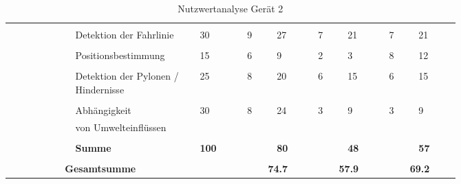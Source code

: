 \documentclass[main.tex]{subfiles} %
\begin{document}
\begin{landscape}
\begin{table}[ht]
\begin{tabular}{|p{0.11\linewidth}|p{0.18\linewidth}|p{0.085\linewidth}|p{0.057\linewidth}|p{0.07\linewidth}|p{0.057\linewidth}|p{0.07\linewidth}|p{0.057\linewidth}|p{0.07\linewidth}|}
            \cline{2-9}
            &&&&&&&&\\[-9pt]
            & Detektion der Fahrlinie & 30 & 9 & 27 & 7 & 21 & 7 & 21 \\[1pt]
            \cline{2-9}
            &&&&&&&&\\[-9pt]
            & Positionsbestimmung & 15 & 6 & 9 & 2 & 3 & 8 & 12 \\[1pt]
            \cline{2-9}
            &&&&&&&&\\[-9pt]
            & Detektion der Pylonen / Hindernisse & 25 & 8 & 20 & 6 & 15 & 6 & 15 \\[1pt]
            \cline{2-9}
            &&&&&&&&\\[-9pt]
            & Abhängigkeit & 30 & 8 & 24 & 3 & 9 & 3 & 9 \\[1pt]
            & von Umwelteinflüssen &  &  &  &  &  &  &  \\[1pt]
            \cline{2-9}
            &&&&&&&&\\[-9pt]
            & \textbf{Summe} & \textbf{100} &  & \textbf{80} &  & \textbf{48} &  & \textbf{57} \\[1pt]
            \hline
            \hline
            \multicolumn{2}{|c|}{} &&\multicolumn{2}{c|}{}&\multicolumn{2}{c|}{}&\multicolumn{2}{c|}{} \\[-9pt]
            \multicolumn{2}{|c|}{\textbf{Gesamtsumme}} &  & \multicolumn{2}{c|}{\textbf{74.7}} & \multicolumn{2}{c|}{\textbf{57.9}} & \multicolumn{2}{c|}{\textbf{69.2}} \\[1pt]
            \hline
        \end{tabular}
    \caption{Nutzwertanalyse Gerät 2}
    \end{table}

\end{landscape} %
\end{document}

